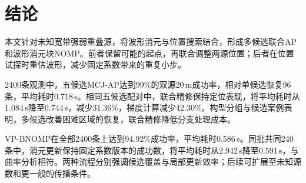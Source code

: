 \section{结论}\label{sec:conclusion}
本文针对未知宽带强弱重叠源，将波形消元与位置搜索结合，形成多候选联合AP和波形消元块NOMP。前者保留可能的起点，再联合调整两源位置；后者在位置试探时重估波形，减少固定系数带来的重复小步。

2400条观测中，五候选MCJ-AP达到99\%的双源20\,m成功率，相对单候选恢复96条，平均耗时0.718\,s。相同五候选配对中，联合精修保持定位表现，将平均耗时从1.084\,s降至0.744\,s，减少31.36\%，梯度计算减少42.30\%。构型分组与候选案例表明，多候选改善困难区域的恢复，联合精修降低分支处理成本。

VP-BNOMP在全部2400条上达到94.92\%成功率，平均耗时0.586\,s。同批共同240条中，消元更新保持固定系数版本的成功数，将平均耗时从2.942\,s降至0.591\,s，与曲率分析相符。两种流程分别强调候选覆盖与局部更新效率；后续可扩展至未知源数和更一般的传播条件。
